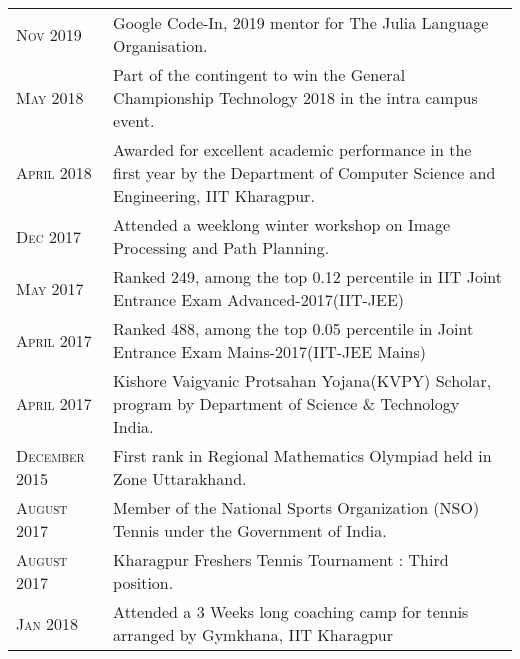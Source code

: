 \documentclass[a4paper,10pt]{extarticle} %
\begin{document}
\begin{tabularx}{\linewidth}{ l | X }

\textsc{Nov 2019} & Google Code-In, 2019 mentor for The Julia Language Organisation. \\
\textsc{May 2018} & Part of the contingent to win the General Championship Technology 2018 in the intra campus event. \\
\textsc{April 2018} & Awarded for excellent academic performance in the first year by the Department of Computer Science and Engineering, IIT Kharagpur. \\
\textsc{Dec 2017} & Attended a weeklong winter workshop on Image Processing and Path Planning. \\
\textsc{May 2017} & Ranked 249, among the top 0.12 percentile in IIT Joint Entrance Exam Advanced-2017(IIT-JEE) \\
\textsc{April 2017} & Ranked 488, among the top 0.05 percentile in Joint Entrance Exam Mains-2017(IIT-JEE Mains) \\
\textsc{April 2017} & Kishore Vaigyanic Protsahan Yojana(KVPY) Scholar, program by Department of Science \& Technology India.\\
\textsc{December 2015} & First rank in Regional Mathematics Olympiad held in Zone Uttarakhand. \\
\textsc{August 2017} & Member of the National Sports Organization (NSO) Tennis under the Government of India. \\
\textsc{August 2017} & Kharagpur Freshers Tennis Tournament : Third position. \\
\textsc{Jan 2018} & Attended a 3 Weeks long coaching camp for tennis arranged by Gymkhana, IIT Kharagpur
\end{tabularx}

\end{document}
